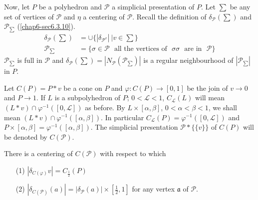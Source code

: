 Now, let $P$ be a polyhedron and $\mathscr{P}$ a simplicial presentation of $P$. Let $\sum$ be any set of vertices of $\mathscr{P}$ and $\eta$ a centering of $\mathscr{P}$. Recall the definition of $\delta_{\mathscr{P}}(\sum)$ and $\mathscr{P}_{\sum}$ (\ref{chap6-sec6.3.10}).
\begin{align*}
\delta_{\mathscr{P}}(\sum) &= \cup\{|\delta_{\mathscr{P}^{v}}|~|v\in\sum\}\\
\mathscr{P}_{\sum} &= \{\sigma\in\mathscr{P}\text{~ all the vertices of~ } \sigma \sigma\text{~ are in~ }\mathscr{P}\}
\end{align*}
$\mathscr{P}_{\sum}$ is full in $\mathscr{P}$ and $\delta_{\mathscr{P}}(\sum)=|N_{\mathscr{P}}(\mathscr{P}_{\sum})|$ is a regular neighbourhood of $|\mathscr{P}_{\sum}|$ in $P$.

Let $C(P)=P\ast v$ be a cone on $P$ and $\varphi:C(P)\to [0,1]$ be the join of $v\to 0$ and $P\to 1$. If $L$ is a subpolyhedron of $P$;\pageoriginale 
$0<\mathcal{L}<1$, $C_{\mathcal{L}}(L)$ will mean $(L\ast v)\cap \varphi^{-1}([0,\mathcal{L}])$ as before. By $L\times[\alpha,\beta]$, $0<\alpha<\beta<1$, we shall mean $(L\ast v)\cap \varphi^{-1}([\alpha,\beta])$. In particular $C_{\mathcal{L}}(P)=\varphi^{-1}([0,\mathcal{L}])$ and $P\times[\alpha,\beta]=\varphi^{-1}([\alpha,\beta])$. The simplicial presentation $\mathscr{P}\ast \{\{v\}\}$ of $C(P)$ will be denoted by $C(\mathscr{P})$. 

\begin{proposition}\label{chap6-prop6.8.3}
There is a centering of $C(\mathscr{P})$ with respect to which
\begin{itemize}
\item[(1)] $|\delta_{C(\varphi)}v|=C_{\frac{1}{2}}(P)$

\item[(2)] $|\delta_{C(\mathscr{P})}(a)|=|\delta_{\mathscr{P}}(a)|\times [\frac{1}{2},1]$ for any vertex $\mathfrak{a}$ of $\mathscr{P}$.
\end{itemize}
\end{proposition}

